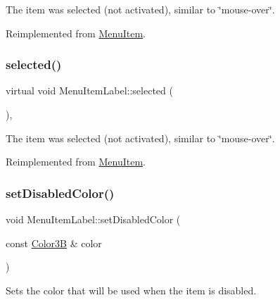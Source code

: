 The item was selected (not activated), similar to \char`\"{}mouse-\/over\char`\"{}. 

Reimplemented from \hyperlink{classMenuItem_aa0330b2c1e2066eb7eee87ade6e6740f}{Menu\+Item}.

\mbox{\label{classMenuItemLabel_a7c274195091bece411d64330754ea2e2}} 
\subsubsection{\texorpdfstring{selected()}{selected()}\hspace{0.1cm}{\footnotesize\ttfamily [2/2]}}
{\footnotesize\ttfamily virtual void Menu\+Item\+Label\+::selected (\begin{DoxyParamCaption}{ }\end{DoxyParamCaption})\hspace{0.3cm}{\ttfamily [override]}, {\ttfamily [virtual]}}

The item was selected (not activated), similar to \char`\"{}mouse-\/over\char`\"{}. 

Reimplemented from \hyperlink{classMenuItem_aa0330b2c1e2066eb7eee87ade6e6740f}{Menu\+Item}.

\mbox{\label{classMenuItemLabel_ae486baf2a29a1270b9b127fcbca33c3e}} 
\subsubsection{\texorpdfstring{set\+Disabled\+Color()}{setDisabledColor()}\hspace{0.1cm}{\footnotesize\ttfamily [1/2]}}
{\footnotesize\ttfamily void Menu\+Item\+Label\+::set\+Disabled\+Color (\begin{DoxyParamCaption}\item[{const \hyperlink{structColor3B}{Color3B} \&}]{color }\end{DoxyParamCaption})\hspace{0.3cm}{\ttfamily [inline]}}

Sets the color that will be used when the item is disabled. \mbox{\label{classMenuItemLabel_ae486baf2a29a1270b9b127fcbca33c3e}} 
